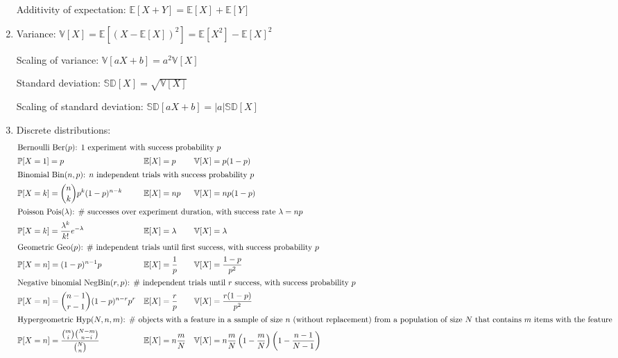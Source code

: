 \documentclass{article}
\begin{document}
\begin{enumerate}
		Additivity of expectation: $\mathbb{E}[X+Y]=\mathbb{E}[X]+\mathbb{E}[Y]$
	
	\item Variance: $\mathbb{V}[X]=\mathbb{E}\left[(X-\mathbb{E}[X])^2\right]=\mathbb{E}\left[X^2\right]-\mathbb{E}[X]^2$
	
		Scaling of variance: $\mathbb{V}[aX+b]=a^2\mathbb{V}[X]$
		
		Standard deviation: $\mathbb{SD}[X]=\sqrt{\mathbb{V}[X]}$
		
		Scaling of standard deviation: $\mathbb{SD}[aX+b]=|a|\mathbb{SD}[X]$
		
	\item Discrete distributions:
		\vspace*{-\baselineskip}
		\begin{align*}
			\intertext{Bernoulli $\mathrm{Ber}(p)$: 1 experiment with success probability $p$}
			&\mathbb{P}[X=1]=p &&\mathbb{E}[X]=p &&\mathbb{V}[X]=p(1-p) \\
			\intertext{Binomial $\mathrm{Bin}(n,p)$: $n$ independent trials with success probability $p$}
			&\mathbb{P}[X=k]={n\choose k}p^k(1-p)^{n-k} &&\mathbb{E}[X]=np &&\mathbb{V}[X]=np(1-p) \\
			\intertext{Poisson $\mathrm{Pois}(\lambda)$: \# successes over experiment duration, with success rate $\lambda=np$}
			&\mathbb{P}[X=k]=\frac{\lambda^k}{k!}e^{-\lambda} &&\mathbb{E}[X]=\lambda &&\mathbb{V}[X]=\lambda \\
			\intertext{Geometric $\mathrm{Geo}(p)$: \# independent trials until first success, with success probability $p$}
			&\mathbb{P}[X=n]=(1-p)^{n-1}p &&\mathbb{E}[X]=\frac{1}{p} &&\mathbb{V}[X]=\frac{1-p}{p^2} \\
			\intertext{Negative binomial $\mathrm{NegBin}(r,p)$: \# independent trials until $r$ success, with success probability $p$}
			&\mathbb{P}[X=n]={n-1\choose r-1}(1-p)^{n-r}p^r &&\mathbb{E}[X]=\frac{r}{p} &&\mathbb{V}[X]=\frac{r(1-p)}{p^2} \\
			\intertext{Hypergeometric $\mathrm{Hyp}(N,n,m)$: \# objects with a feature in a sample of size $n$ (without replacement) from a population of size $N$ that contains $m$ items with the feature}
			&\mathbb{P}[X=n]=\frac{{m\choose i}{N-m\choose n-i}}{{N\choose n}} &&\mathbb{E}[X]=n\frac{m}{N} &&\mathbb{V}[X]=n\frac{m}{N}\left(1-\frac{m}{N}\right)\left(1-\frac{n-1}{N-1}\right)
		\end{align*}
		

\end{enumerate}
\end{document}
